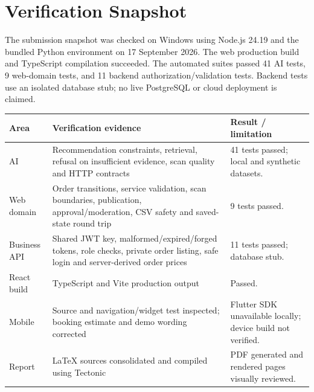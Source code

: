 \section{Verification Snapshot}
The submission snapshot was checked on Windows using Node.js 24.19 and the
bundled Python environment on 17 September 2026. The web production build and
TypeScript compilation succeeded. The automated suites passed 41 AI tests,
9 web-domain tests, and 11 backend authorization/validation tests. Backend tests
use an isolated database stub; no live PostgreSQL or cloud deployment is claimed.

\begin{longtable}{p{}p{}p{}}
\toprule\textbf{Area} & \textbf{Verification evidence} & \textbf{Result / limitation}\\\midrule\endhead
AI & Recommendation constraints, retrieval, refusal on insufficient evidence, scan quality and HTTP contracts & 41 tests passed; local and synthetic datasets.\\
Web domain & Order transitions, service validation, scan boundaries, publication, approval/moderation, CSV safety and saved-state round trip & 9 tests passed.\\
Business API & Shared JWT key, malformed/expired/forged tokens, role checks, private order listing, safe login and server-derived order prices & 11 tests passed; database stub.\\
React build & TypeScript and Vite production output & Passed.\\
Mobile & Source and navigation/widget test inspected; booking estimate and demo wording corrected & Flutter SDK unavailable locally; device build not verified.\\
Report & LaTeX sources consolidated and compiled using Tectonic & PDF generated and rendered pages visually reviewed.\\
\bottomrule
\end{longtable}

